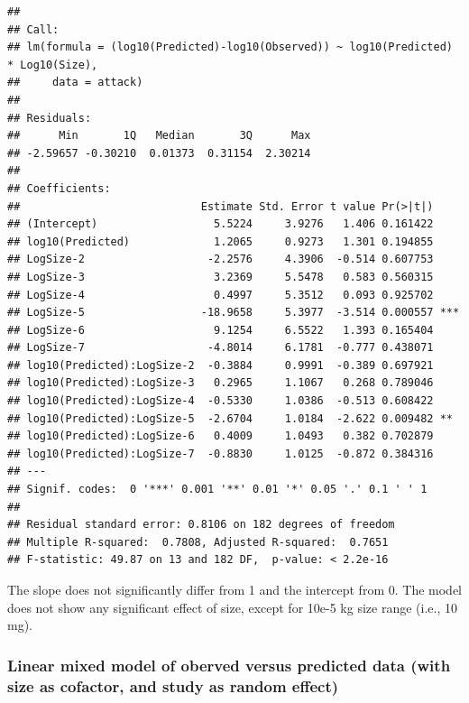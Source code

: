\documentclass[utf8, 12 pt]{frontiers_suppmat}
\begin{document}
\begin{verbatim}
## 
## Call:
## lm(formula = (log10(Predicted)-log10(Observed)) ~ log10(Predicted) * Log10(Size), 
##     data = attack)
## 
## Residuals:
##      Min       1Q   Median       3Q      Max 
## -2.59657 -0.30210  0.01373  0.31154  2.30214 
## 
## Coefficients:
##                            Estimate Std. Error t value Pr(>|t|)    
## (Intercept)                  5.5224     3.9276   1.406 0.161422    
## log10(Predicted)             1.2065     0.9273   1.301 0.194855    
## LogSize-2                   -2.2576     4.3906  -0.514 0.607753    
## LogSize-3                    3.2369     5.5478   0.583 0.560315    
## LogSize-4                    0.4997     5.3512   0.093 0.925702    
## LogSize-5                  -18.9658     5.3977  -3.514 0.000557 ***
## LogSize-6                    9.1254     6.5522   1.393 0.165404    
## LogSize-7                   -4.8014     6.1781  -0.777 0.438071    
## log10(Predicted):LogSize-2  -0.3884     0.9991  -0.389 0.697921    
## log10(Predicted):LogSize-3   0.2965     1.1067   0.268 0.789046    
## log10(Predicted):LogSize-4  -0.5330     1.0386  -0.513 0.608422    
## log10(Predicted):LogSize-5  -2.6704     1.0184  -2.622 0.009482 ** 
## log10(Predicted):LogSize-6   0.4009     1.0493   0.382 0.702879    
## log10(Predicted):LogSize-7  -0.8830     1.0125  -0.872 0.384316    
## ---
## Signif. codes:  0 '***' 0.001 '**' 0.01 '*' 0.05 '.' 0.1 ' ' 1
## 
## Residual standard error: 0.8106 on 182 degrees of freedom
## Multiple R-squared:  0.7808, Adjusted R-squared:  0.7651 
## F-statistic: 49.87 on 13 and 182 DF,  p-value: < 2.2e-16
\end{verbatim}
The slope does not significantly differ from 1 and the intercept from 0.
The model does not show any significant effect of size, except for 10e-5
kg size range (i.e., 10 mg).
\par
\vspace{0.3 cm}

\hypertarget{linear-mixed-model-of-oberved-versus-predicted-data-with-size-as-cofactor-and-study-as-random-effect}{%
\subsubsection{Linear mixed model of oberved versus predicted data (with
size as cofactor, and study as random
effect)}\label{linear-mixed-model-of-oberved-versus-predicted-data-with-size-as-cofactor-and-study-as-random-effect}}
\end{document}
